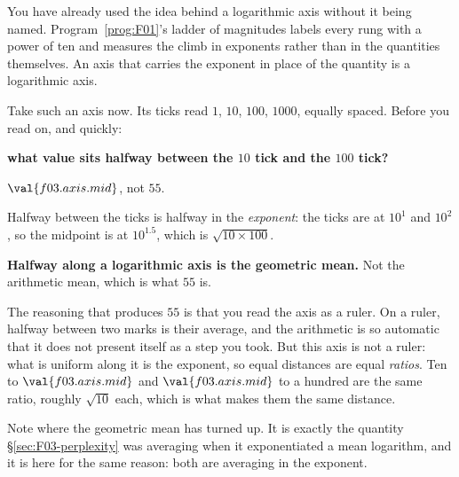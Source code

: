\begin{fr}
You have already used the idea behind a logarithmic axis without it being
named. Program~\ref{prog:F01}'s ladder of magnitudes labels every rung with a
power of ten and measures the climb in exponents rather than in the quantities
themselves. An axis that carries the exponent in place of the quantity is a
logarithmic axis.

Take such an axis now. Its ticks read $1$, $10$, $100$, $1000$, equally
spaced. Before you read on, and quickly:

\textbf{what value sits halfway between the $10$ tick and the $100$ tick?}
\dotline
\nextframe
\end{fr}

\begin{fr}
\begin{ansblock}
$\val{f03.axis.mid}$, not $55$.

Halfway between the ticks is halfway in the \emph{exponent}: the ticks are at
$10^{1}$ and $10^{2}$, so the midpoint is at $10^{\num{1.5}}$, which is
$\sqrt{10 \times 100}$.
\end{ansblock}

\begin{trapbox}
\textbf{Halfway along a logarithmic axis is the geometric mean.} Not the
arithmetic mean, which is what $55$ is.

The reasoning that produces $55$ is that you read the axis as a ruler. On a
ruler, halfway between two marks is their average, and the arithmetic is so
automatic that it does not present itself as a step you took. But this axis is
not a ruler: what is uniform along it is the exponent, so equal distances are
equal \emph{ratios}. Ten to $\val{f03.axis.mid}$ and $\val{f03.axis.mid}$ to a
hundred are the same ratio, roughly $\sqrt{10}$ each, which is what makes them
the same distance.

Note where the geometric mean has turned up. It is exactly the quantity
\S\ref{sec:F03-perplexity} was averaging when it exponentiated a mean
logarithm, and it is here for the same reason: both are averaging in the
exponent.
\end{trapbox}
\end{fr}


